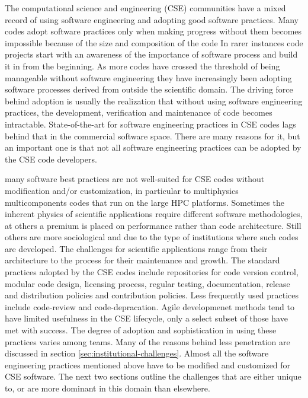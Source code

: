 The computational science and engineering (CSE) communities have a mixed record
of using software engineering and adopting good software
practices. Many codes adopt software practices only when making
progress without them becomes impossible because of the size and
composition of the code  In rarer instances code projects start with
an awareness of the importance of software process and build it in
from the beginning. As more codes have crossed the threshold of being 
manageable without software engineering they have increasingly been  
adopting software processes derived from outside the scientific
domain. The driving force behind adoption is usually the realization
that without using software engineering practices, the development,
verification and maintenance of code becomes
intractable. State-of-the-art for software engineering
practices in CSE codes lags behind that in the commercial software
space. There are many reasons for it, but an important one is that
not all software engineering practices can be adopted by the CSE code
developers. 

many software best practices are not well-suited for CSE codes without
modification and/or customization, in particular to multiphysics
multicomponents codes that run on the large HPC platforms. Sometimes
the inherent physics of scientific applications require different
software methodologies, at others a premium is placed on
performance rather than code architecture.  Still others are more
sociological and due to the type of institutions where such codes are
developed. The challenges for scientific applications range
from their architecture to the process for their maintenance and
growth. The standard practices adopted by the CSE codes include
repositories for code version control, modular code design, licensing
process, regular testing, documentation, release and distribution
policies and contribution policies. Less frequently used practices
include code-review and code-depracation. Agile developmenet methods
tend to have limited usefulness in the CSE lifecycle, only a
select subset of those have met with success. The degree of adoption and
sophistication in using these  practices varies among teams. Many of
the reasons behind less penetration are discussed in section
\ref{sec:institutional-challenges}. Almost all the software
engineering practices mentioned above have to be modified and
customized for CSE software. The next two sections outline the
challenges that are either unique to, or are more dominant in this
domain than elsewhere. 


